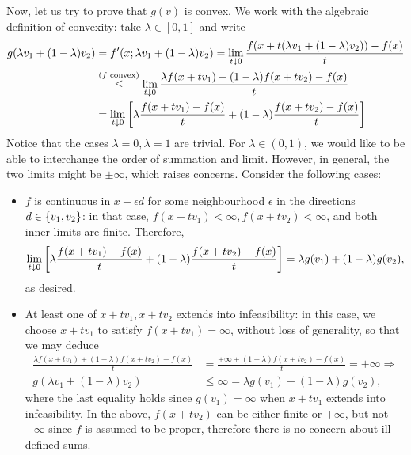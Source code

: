 \documentclass[10pt]{article}
\begin{document}
\begin{Exercise}
	Now, let us try to prove that $g(v)$ is convex. We work with the algebraic
	definition of convexity: take $\lambda \in [0, 1]$ and write
	\begin{align*}
		g(\lambda v_1 +( 1 - \lambda )v_2) &= f'(x; \lambda v_1 + (1 - \lambda)
		v_2) = \lim_{t \downarrow 0} \frac{f(x + t (\lambda v_1 + (1 - \lambda)
		v_2)) - f(x)}{t} \\
            &\overset{(\text{$f$ convex})}{\leq} \lim_{t \downarrow 0}
                \frac{\lambda f(x + t v_1) + (1 - \lambda) f(x + t v_2)
                    - f(x)}{t} \\
            &= \lim_{t \downarrow 0} \left[ \lambda \frac{f(x + t v_1) - f(x)}{t}
             + (1 - \lambda) \frac{f(x + t v_2) - f(x)}{t} \right]
	\end{align*}
    Notice that the cases $\lambda = 0, \lambda = 1$ are trivial.
    For $\lambda \in (0, 1)$, we would like to be able to interchange the order
    of summation and limit. However, in general, the two limits might be $\pm
    \infty$, which raises concerns. Consider the following cases:
    \begin{itemize}
    \item $f$ is continuous in $x + \epsilon d$ for some neighbourhood
    $\epsilon$ in the directions $d \in \left\{ v_1, v_2 \right\}$: in that case, $f(x + t
    v_1) < \infty, f(x + tv_2) < \infty$, and both inner limits are finite.
    Therefore,
    \[
        \lim_{t \downarrow 0} \left[ \lambda \frac{f(x + tv_1) - f(x)}{t}
        + (1 - \lambda )\frac{f(x + tv_2) - f(x)}{t}\right]
        = \lambda g(v_1) + (1 - \lambda) g(v_2),
    \]
    as desired.
    \item At least one of $x + tv_1, x + tv_2$ extends into infeasibility: in
        this case, we choose $x + tv_1$ to satisfy $f(x + tv_1) = \infty$,
        without loss of generality, so that we may deduce
        \begin{align}
            \frac{\lambda f(x + tv_1) + (1 - \lambda) f(x + tv_2) - f(x)}{t} &=
            \frac{+\infty + (1 - \lambda) f(x + tv_2) - f(x)}{t} = +\infty
            \Rightarrow \\
            g(\lambda v_1 + (1 - \lambda) v_2) &\leq \infty =
                \lambda g(v_1) + (1 - \lambda) g(v_2),
        \end{align}
        where the last equality holds since $g(v_1) = \infty$ when $x + tv_1$
        extends into infeasibility. In the above, $f(x + tv_2)$ can be either
        finite or $+\infty$, but not $-\infty$ since $f$ is assumed to be
        proper, therefore there is no concern about ill-defined sums.
    \end{itemize}


\end{Exercise}
\end{document}
